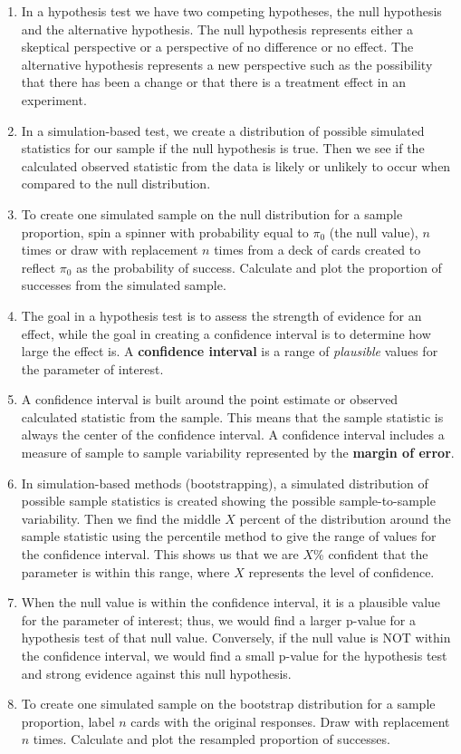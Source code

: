 \documentclass[
]{report}
\begin{document}
\begin{enumerate}
\def\labelenumi{\arabic{enumi}.}
\item
  In a hypothesis test we have two competing hypotheses, the null hypothesis and the alternative hypothesis. The null hypothesis represents either a skeptical perspective or a perspective of no difference or no effect. The alternative hypothesis represents a new perspective such as the possibility that there has been a change or that there is a treatment effect in an experiment.
\item
  In a simulation-based test, we create a distribution of possible simulated statistics for our sample if the null hypothesis is true. Then we see if the calculated observed statistic from the data is likely or unlikely to occur when compared to the null distribution.
\item
  To create one simulated sample on the null distribution for a sample proportion, spin a spinner with probability equal to \(\pi_0\) (the null value), \(n\) times or draw with replacement \(n\) times from a deck of cards created to reflect \(\pi_0\) as the probability of success. Calculate and plot the proportion of successes from the simulated sample.
\item
  The goal in a hypothesis test is to assess the strength of evidence for an effect, while the goal in creating a confidence interval is to determine how large the effect is. A \textbf{confidence interval} is a range of \emph{plausible} values for the parameter of interest.
\item
  A confidence interval is built around the point estimate or observed calculated statistic from the sample. This means that the sample statistic is always the center of the confidence interval. A confidence interval includes a measure of sample to sample variability represented by the \textbf{margin of error}.
\item
  In simulation-based methods (bootstrapping), a simulated distribution of possible sample statistics is created showing the possible sample-to-sample variability. Then we find the middle \(X\) percent of the distribution around the sample statistic using the percentile method to give the range of values for the confidence interval. This shows us that we are \(X\)\% confident that the parameter is within this range, where \(X\) represents the level of confidence.
\item
  When the null value is within the confidence interval, it is a plausible value for the parameter of interest; thus, we would find a larger p-value for a hypothesis test of that null value. Conversely, if the null value is NOT within the confidence interval, we would find a small p-value for the hypothesis test and strong evidence against this null hypothesis.
\item
  To create one simulated sample on the bootstrap distribution for a sample proportion, label \(n\) cards with the original responses. Draw with replacement \(n\) times. Calculate and plot the resampled proportion of successes.
\end{enumerate}
\end{document}
